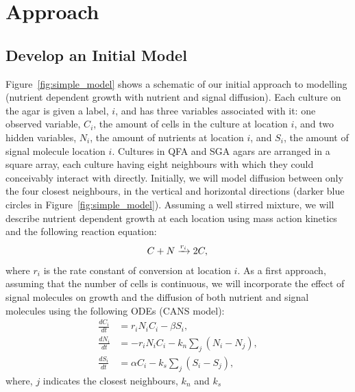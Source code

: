 \graphicspath{{images_low_res/}}
\section{Approach}
\label{sec:approach}

\subsection{Develop an Initial Model}
\label{sec:initial_model}

Figure~\ref{fig:simple_model} shows a schematic of our initial
approach to modelling (nutrient dependent growth with nutrient and
signal diffusion).  Each culture on the agar is given a label, \(i\),
and has three variables associated with it: one observed variable,
\(C_{i}\), the amount of cells in the culture at location \(i\), and
two hidden variables, \(N_{i}\), the amount of nutrients at location
\(i\), and \(S_{i}\), the amount of signal molecule location \(i\).
Cultures in QFA and SGA agars are arranged in a square array, each
culture having eight neighbours with which they could conceivably
interact with directly. Initially, we will model diffusion between
only the four closest neighbours, in the vertical and horizontal
directions (darker blue circles in
Figure~\ref{fig:simple_model}). Assuming a well stirred mixture, we
will describe nutrient dependent growth at each location using mass
action kinetics and the following reaction equation:
\begin{equation}
  \label{eq:2}
  C + N \xrightarrow[]{r_{i}} 2C,\\
\end{equation}
where \(r_{i}\) is the rate constant of conversion at location \(i\).
As a first approach, assuming that the number of cells is continuous,
we will incorporate the effect of signal molecules on growth and the
diffusion of both nutrient and signal molecules using the following
ODEs (CANS model):
\begin{subequations}
  \label{eq:3}
  \begin{align}
    \frac{dC_{i}}{dt}& = r_{i}N_{i}C_{i} - \beta S_{i},\\
    \frac{dN_{i}}{dt}& = - r_{i}N_{i}C_{i} - k_{n}\sum_{j}(N_{i} - N_{j}),\\
    \frac{dS_{i}}{dt}& = \alpha C_{i} - k_{s}\sum_{j}(S_{i} - S_{j}),
  \end{align}
\end{subequations}
where, \(j\) indicates the closest neighbours, \(k_{n}\) and \(k_{s}\)
